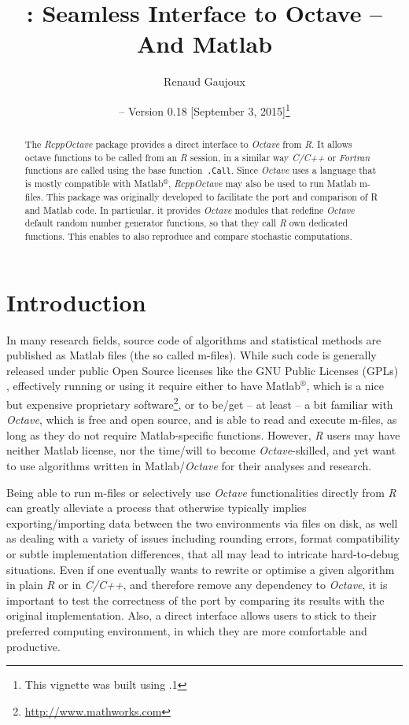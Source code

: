 \documentclass[english,10pt,a4paper]{article}\usepackage[]{graphicx}\usepackage[]{color}
\author{Renaud Gaujoux}
\title{\pkgname{RcppOctave}: Seamless Interface to Octave -- And Matlab}
\date{\Rpkg{RcppOctave} -- Version 0.18
[September  3, 2015]\footnote{This vignette was built using \octave
3.8.1}}
\newcommand{\matlab}{Matlab$^\circledR$\xspace}
\let\proglang=\textit
\let\code=\texttt
\newcommand{\pkgname}[1]{\textit{#1}\xspace}
\newcommand{\Rpkg}[1]{\pkgname{#1} package\xspace}
\newcommand{\R}{\proglang{R}\xspace}
\newcommand{\octave}{\proglang{Octave}\xspace}
\begin{document}
\maketitle

\begin{abstract}
The \Rpkg{RcppOctave} provides a direct interface to \octave from
\R.
It allows \\octave functions to be called from an \R session,
in a similar way \proglang{C/C++} or \proglang{Fortran} functions are called using the base function~\code{.Call}.
Since \octave uses a language that is mostly compatible with \matlab,
\pkgname{RcppOctave} may also be used to run Matlab m-files.
This package was originally developed to facilitate the port and comparison of R
and Matlab code.
In particular, it provides \octave modules that redefine
\octave default random number generator functions, so that they call
\proglang{R} own dedicated functions.
This enables to also reproduce and compare stochastic computations.
\end{abstract}

\noindent\hrulefill
\tableofcontents
\noindent\hrulefill

\section{Introduction}

In many research fields, source code of algorithms and statistical methods are
published as Matlab files (the so called m-files).
While such code is generally released under public Open Source licenses like the
GNU Public Licenses (GPLs) \cite{gnuGPL}, effectively running or using it
require either to have \matlab, which is a nice but expensive proprietary
software\footnote{\url{http://www.mathworks.com}}, or to be/get -- at least -- a bit familiar with \octave \cite{Eaton2002}, which is free and open source, and is able to read and execute m-files, as long as they do not require Matlab-specific functions.
However, \proglang{R} users may have neither Matlab license, nor the
time/will to become \octave-skilled, and yet want to use algorithms written in
Matlab/\octave for their analyses and research.

Being able to run m-files or selectively use \octave functionalities
directly from \proglang{R} can greatly alleviate a process that otherwise
typically implies exporting/importing data between the two environments via
files on disk, as well as dealing with a variety of issues including
rounding errors, format compatibility or subtle implementation differences,
that all may lead to intricate hard-to-debug situations.
Even if one eventually wants to rewrite or optimise a given algorithm in plain
\proglang{R} or in \proglang{C/C++}, and therefore remove any dependency to
\octave, it is important to test the correctness of the port by
comparing its results with the original implementation.
Also, a direct interface allows users to stick to their preferred computing
environment, in which they are more comfortable and productive.
\end{document}
